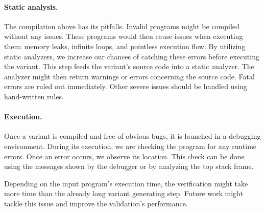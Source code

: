 \paragraph{Static analysis.} The compilation above has its pitfalls. 
Invalid programs might be compiled without any issues. 
These programs would then cause issues when executing them: memory leaks, 
infinite loops, and pointless execution flow. 
By utilizing static analyzers, we increase our chances of catching these 
errors before executing the variant. This step feeds the variant's source 
code into a static analyzer. 
The analyzer might then return warnings or errors concerning the source code. Fatal errors are ruled out immediately. Other severe issues should be handled using hand-written rules.

\paragraph{Execution.} Once a variant is compiled and free of obvious bugs, 
it is launched in a debugging environment. 
During its execution, we are checking the program for any runtime errors. 
Once an error occurs, we observe its location. 
This check can be done using the messages shown by the debugger or by 
analyzing the top stack frame.

Depending on the input program's execution time, the verification might take 
more time than the already long variant generating step. 
Future work might tackle this issue and improve the validation's performance.